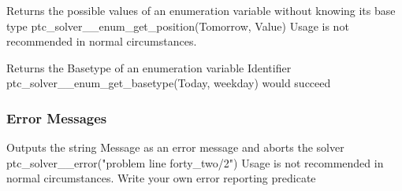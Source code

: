 \documentclass{article}
\begin{document}
        {Returns the possible values of an enumeration variable without knowing
its base type}
        {ptc\_solver\_\_enum\_get\_position(Tomorrow, Value)}
        {Usage is not recommended in normal circumstances.}


        {Returns the Basetype of an enumeration variable Identifier}
        {ptc\_solver\_\_enum\_get\_basetype(Today, weekday) would succeed}
        {}

\subsubsection{Error Messages}

\hspace{\parindent}
        {Outputs the string Message as an error message and aborts the solver}
        {ptc\_solver\_\_error("problem line forty\_two/2")}
        {Usage is not recommended in normal circumstances. Write your own error
reporting predicate}

%
%

\end{document}
